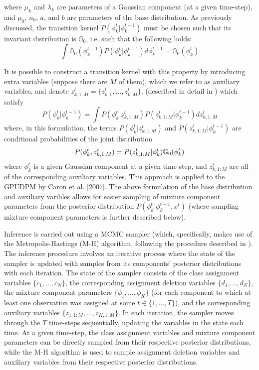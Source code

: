 \documentclass{article}
\begin{document}
where $\mu_{k}$ and $\lambda_{k}$ are parameters of a Gaussian component (at a given time-step), and $\mu_{0}$, $n_{0}$, $a$, and $b$ are parameters of the base distribution. As previously discussed, the transition kernel $P(\phi_{k}^{t} | \phi_{k}^{t-1})$ must be chosen such that its invariant distribution is $\mathbb{G}_{0}$, i.e. such that the following holds:
\begin{equation}
\int \mathbb{G}_{0}(\phi_{k}^{t-1}) P(\phi_{k}^{t} | \phi_{k}^{t-1}) d\phi_{k}^{t-1}  =  \mathbb{G}_{0}(\phi_{k}^{t})
\end{equation}

It is possible to construct a transition kernel with this property by introducing extra variables (suppose there are $M$ of them), which we refer to as auxiliary variables, and denote $z_{k, 1:M}^{t} = \{ z_{k, 1}^{t}, \ldots, z_{k, M}^{t} \}$, (described in detail in \cite{Gasthaus_thesis}) which satisfy
\begin{equation}
P(\phi_{k}^{t} | \phi_{k}^{t-1}) = \int P(\phi_{k}^{t} | z_{k, 1:M}^{t}) P(z_{k, 1:M}^{t} | \phi_{k}^{t-1}) dz_{k, 1:M}^{t}
\end{equation}
where, in this formulation, the terms $P(\phi_{k}^{t} | z_{k, 1:M}^{t})$ and $P(z_{k, 1:M}^{t} | \phi_{k}^{t-1})$ are conditional probabilities of the joint distribution
\begin{equation}
P(\phi_{k}^{t}, z_{k, 1:M}^{t}) = P(z_{k, 1:M}^{t} | \phi_{k}^{t}) \mathbb{G}_{0}(\phi_{k}^{t})
\vspace{4pt}
\end{equation}
where $\phi_{k}^{t}$ is a given Gaussian component at a given time-step, and $z_{k, 1:M}^{t}$ are all of the corresponding auxiliary variables. This approach is applied to the GPUDPM by Caron et al. [2007]. The above formulation of the base distribution and auxiliary varibles allows for easier sampling of mixture component parameters from the posterior distribution $P(\phi_{k}^{t} | \phi_{k}^{t-1}, x^{t})$ (where sampling mixture component parameters is further described below).

Inference is carried out using a MCMC sampler (which, specifically, makes use of the Metropolis-Hastings (M-H) algorithm, following the procedure described in \cite{Gasthaus_thesis}). The inference procedure involves an iterative process where the state of the sampler is updated with samples from its components' posterior distributions with each iteration. The state of the sampler consists of the class assignment variables $\{ c_{1}, \ldots, c_{N} \}$, the corresponding assignment deletion variables $\{ d_{1}, \ldots, d_{N} \}$, the mixture component parameters $\{ \phi_{1}, \ldots, \phi_{K} \}$ (for each component to which at least one observation was assigned at some $t \in \{1, \ldots, T \}$), and the corresponding auxiliary variables $\{ z_{1, 1:M}, \ldots, z_{K, 1:M} \}$. In each iteration, the sampler moves through the $T$ time-steps sequentially, updating the variables in the state each time. At a given time-step, the class assignment variables and mixture component parameters can be directly sampled from their respective posterior distributions, while the M-H algorithm is used to sample assignment deletion variables and auxiliary variables from their respective posterior distributions.
\end{document}
